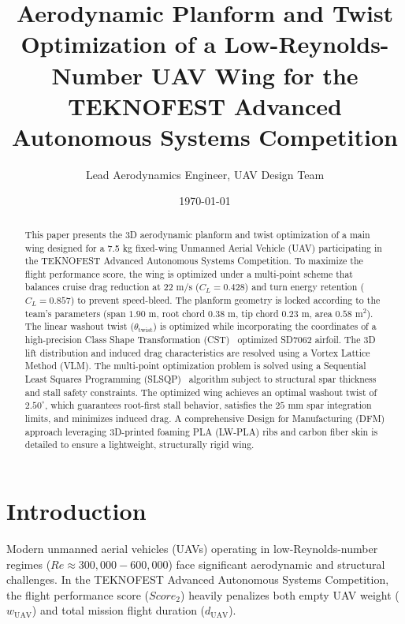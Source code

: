 \documentclass[11pt]{article}
\begin{document}
\title{\textbf{Aerodynamic Planform and Twist Optimization of a Low-Reynolds-Number UAV Wing for the TEKNOFEST Advanced Autonomous Systems Competition}}

\author{Lead Aerodynamics Engineer, UAV Design Team}
\date{\today}

\maketitle

\begin{abstract}
This paper presents the 3D aerodynamic planform and twist optimization of a main wing designed for a 7.5 kg fixed-wing Unmanned Aerial Vehicle (UAV) participating in the TEKNOFEST Advanced Autonomous Systems Competition. To maximize the flight performance score, the wing is optimized under a multi-point scheme that balances cruise drag reduction at $22\text{ m/s}$ ($C_L = 0.428$) and turn energy retention ($C_L = 0.857$) to prevent speed-bleed. The planform geometry is locked according to the team's parameters (span $1.90\text{ m}$, root chord $0.38\text{ m}$, tip chord $0.23\text{ m}$, area $0.58\text{ m}^2$). The linear washout twist ($\theta_{\text{twist}}$) is optimized while incorporating the coordinates of a high-precision Class Shape Transformation (CST)~\cite{kulfan2008} optimized SD7062 airfoil. The 3D lift distribution and induced drag characteristics are resolved using a Vortex Lattice Method (VLM). The multi-point optimization problem is solved using a Sequential Least Squares Programming (SLSQP)~\cite{kraft1988} algorithm subject to structural spar thickness and stall safety constraints. The optimized wing achieves an optimal washout twist of $2.50^\circ$, which guarantees root-first stall behavior, satisfies the $25\text{ mm}$ spar integration limits, and minimizes induced drag. A comprehensive Design for Manufacturing (DFM) approach leveraging 3D-printed foaming PLA (LW-PLA) ribs and carbon fiber skin is detailed to ensure a lightweight, structurally rigid wing.
\end{abstract}

\section{Introduction}
Modern unmanned aerial vehicles (UAVs) operating in low-Reynolds-number regimes ($Re \approx 300,000 - 600,000$) face significant aerodynamic and structural challenges. In the TEKNOFEST Advanced Autonomous Systems Competition, the flight performance score ($Score_2$) heavily penalizes both empty UAV weight ($w_{\text{UAV}}$) and total mission flight duration ($d_{\text{UAV}}$). 
\end{document}
